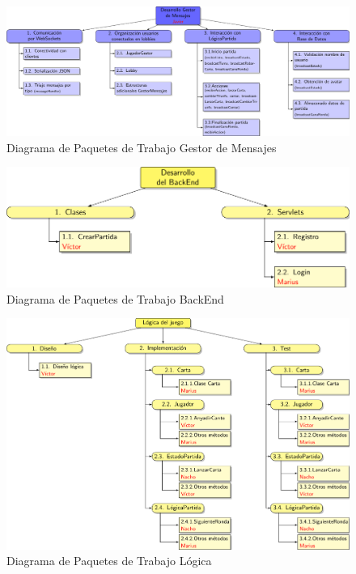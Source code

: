 \begin{figure}[H]
		\hspace{-2cm}
		\includegraphics[scale=0.75]{figuras/edtGestorMensajes.pdf}
		\caption{Diagrama de Paquetes de Trabajo Gestor de Mensajes}
	\end{figure}


\begin{figure}[H]
		\centering
		\includegraphics[scale=0.8]{figuras/edtBackend.pdf}
		\caption{Diagrama de Paquetes de Trabajo BackEnd}
	\end{figure}

\begin{figure}[H]
		\hspace{-1cm}
		\includegraphics[scale=0.8]{figuras/edtLogica.pdf}
		\caption{Diagrama de Paquetes de Trabajo Lógica}
	\end{figure}

